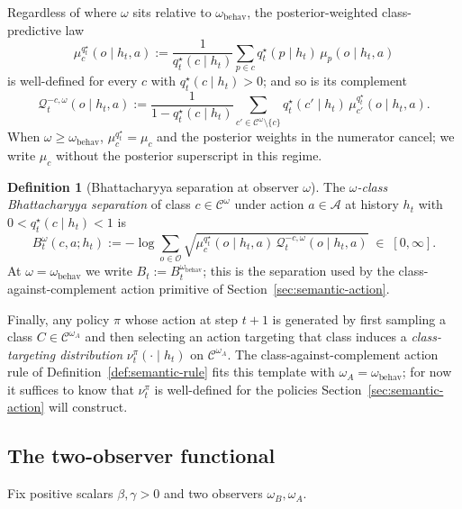 \documentclass[11pt]{article}
\theoremstyle{definition}
\newtheorem{definition}[theorem]{Definition}
\theoremstyle{remark}
\newcommand{\Acal}{\mathcal{A}}
\newcommand{\Ccal}{\mathcal{C}}
\newcommand{\Ocal}{\mathcal{O}}
\newcommand{\Qcal}{\mathcal{Q}}
\begin{document}
Regardless of where $\omega$ sits relative to $\omega_{\mathrm{behav}}$, the posterior-weighted class-predictive law
\[
\mu_c^{q_t^\star}(o\mid h_t,a):=\frac{1}{q_t^\star(c\mid h_t)}\sum_{p\in c}q_t^\star(p\mid h_t)\,\mu_p(o\mid h_t,a)
\]
is well-defined for every $c$ with $q_t^\star(c\mid h_t)>0$; and so is its complement
\[
\Qcal_t^{-c,\omega}(o\mid h_t,a):=\frac{1}{1-q_t^\star(c\mid h_t)}\sum_{c'\in\Ccal^\omega\setminus\{c\}}q_t^\star(c'\mid h_t)\,\mu_{c'}^{q_t^\star}(o\mid h_t,a).
\]
When $\omega\ge\omega_{\mathrm{behav}}$, $\mu_c^{q_t^\star}=\mu_c$ and the posterior weights in the numerator cancel; we write $\mu_c$ without the posterior superscript in this regime.

\begin{definition}[Bhattacharyya separation at observer $\omega$]
\label{def:bhat-omega}
The \emph{$\omega$-class Bhattacharyya separation} of class $c\in\Ccal^\omega$ under action $a\in\Acal$ at history $h_t$ with $0<q_t^\star(c\mid h_t)<1$ is
\[
B_t^\omega(c,a;h_t):=-\log\sum_{o\in\Ocal}\sqrt{\mu_c^{q_t^\star}(o\mid h_t,a)\,\Qcal_t^{-c,\omega}(o\mid h_t,a)}\;\in\;[0,\infty].
\]
At $\omega=\omega_{\mathrm{behav}}$ we write $B_t:=B_t^{\omega_{\mathrm{behav}}}$; this is the separation used by the class-against-complement action primitive of Section~\ref{sec:semantic-action}.
\end{definition}

Finally, any policy $\pi$ whose action at step $t+1$ is generated by first sampling a class $C\in\Ccal^{\omega_A}$ and then selecting an action targeting that class induces a \emph{class-targeting distribution} $\nu_t^\pi(\cdot\mid h_t)$ on $\Ccal^{\omega_A}$. The class-against-complement action rule of Definition~\ref{def:semantic-rule} fits this template with $\omega_A=\omega_{\mathrm{behav}}$; for now it suffices to know that $\nu_t^\pi$ is well-defined for the policies Section~\ref{sec:semantic-action} will construct.

\subsection{The two-observer functional}
\label{sec:two-observer-functional}

Fix positive scalars $\beta,\gamma>0$ and two observers $\omega_B,\omega_A$.
\end{document}
